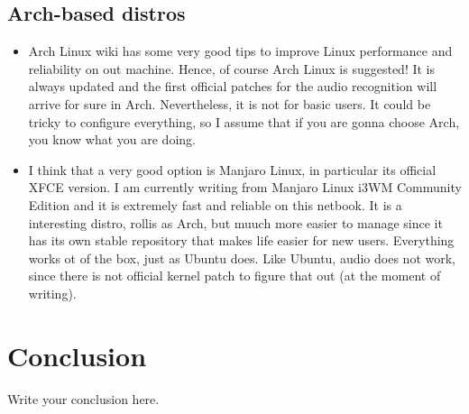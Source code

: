 \documentclass{article}
\begin{document}
\subsection{Arch-based distros}
\begin{itemize}
	\item Arch Linux wiki has some very good tips to improve Linux performance and reliability on out machine. Hence, of course Arch Linux is suggested! It is always updated and the first official patches for the audio recognition will arrive for sure in Arch. Nevertheless, it is not for basic users. It could be tricky to configure everything, so I assume that if you are gonna choose Arch, you know what you are doing.
	\item I think that a very good option is Manjaro Linux, in particular its official XFCE version. I am currently writing from Manjaro Linux i3WM Community Edition and it is extremely fast and reliable on this netbook. It is a interesting distro, rollis as Arch, but muuch more easier to manage since it has its own stable repository that makes life easier for new users. Everything works ot of the box, just as Ubuntu does. Like Ubuntu, audio does not work, since there is not official kernel patch to figure that out (at the moment of writing).
\end{itemize}

\section{Conclusion}
Write your conclusion here.
\end{document}
